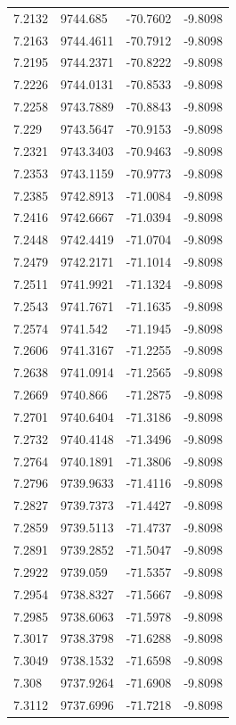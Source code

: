 \begin{table}[H]
\begin{tabular}{llll}
7.2132 & 9744.685 & -70.7602 & -9.8098 \\
7.2163 & 9744.4611 & -70.7912 & -9.8098 \\
7.2195 & 9744.2371 & -70.8222 & -9.8098 \\
7.2226 & 9744.0131 & -70.8533 & -9.8098 \\
7.2258 & 9743.7889 & -70.8843 & -9.8098 \\
7.229 & 9743.5647 & -70.9153 & -9.8098 \\
7.2321 & 9743.3403 & -70.9463 & -9.8098 \\
7.2353 & 9743.1159 & -70.9773 & -9.8098 \\
7.2385 & 9742.8913 & -71.0084 & -9.8098 \\
7.2416 & 9742.6667 & -71.0394 & -9.8098 \\
7.2448 & 9742.4419 & -71.0704 & -9.8098 \\
7.2479 & 9742.2171 & -71.1014 & -9.8098 \\
7.2511 & 9741.9921 & -71.1324 & -9.8098 \\
7.2543 & 9741.7671 & -71.1635 & -9.8098 \\
7.2574 & 9741.542 & -71.1945 & -9.8098 \\
7.2606 & 9741.3167 & -71.2255 & -9.8098 \\
7.2638 & 9741.0914 & -71.2565 & -9.8098 \\
7.2669 & 9740.866 & -71.2875 & -9.8098 \\
7.2701 & 9740.6404 & -71.3186 & -9.8098 \\
7.2732 & 9740.4148 & -71.3496 & -9.8098 \\
7.2764 & 9740.1891 & -71.3806 & -9.8098 \\
7.2796 & 9739.9633 & -71.4116 & -9.8098 \\
7.2827 & 9739.7373 & -71.4427 & -9.8098 \\
7.2859 & 9739.5113 & -71.4737 & -9.8098 \\
7.2891 & 9739.2852 & -71.5047 & -9.8098 \\
7.2922 & 9739.059 & -71.5357 & -9.8098 \\
7.2954 & 9738.8327 & -71.5667 & -9.8098 \\
7.2985 & 9738.6063 & -71.5978 & -9.8098 \\
7.3017 & 9738.3798 & -71.6288 & -9.8098 \\
7.3049 & 9738.1532 & -71.6598 & -9.8098 \\
7.308 & 9737.9264 & -71.6908 & -9.8098 \\
7.3112 & 9737.6996 & -71.7218 & -9.8098 \\

\end{tabular}
\end{table}
